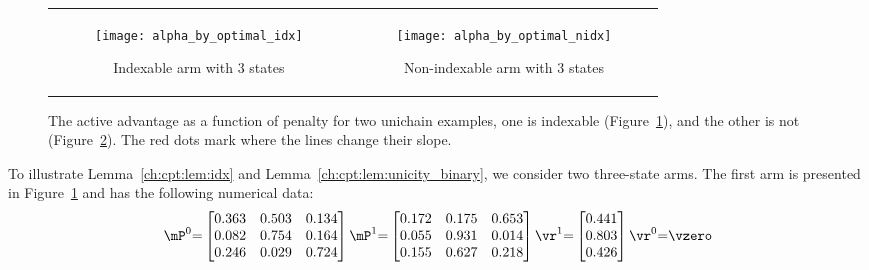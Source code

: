 \begin{figure}[ht]
    \begin{tabular}{cc}
        \begin{subfigure}[t]{0.48\linewidth}
            \texttt{[image: alpha\_by\_optimal\_idx]}
            \caption{Indexable arm with $3$ states}
            \label{fig:illustrate_vf}
        \end{subfigure}
        &\begin{subfigure}[t]{0.48\linewidth}
            \texttt{[image: alpha\_by\_optimal\_nidx]}
            \caption{Non-indexable arm with $3$ states}
            \label{fig:illustrate_non_indexable}
        \end{subfigure}            
    \end{tabular}
    \caption{
        The active advantage as a function of penalty for two unichain examples, one is indexable (Figure~\ref{fig:illustrate_vf}), and the other is not (Figure~\ref{fig:illustrate_non_indexable}).
        The red dots mark where the lines change their slope.
    }
    \label{fig:illustrate_indexability}
\end{figure}

To illustrate Lemma~\ref{ch:cpt:lem:idx} and Lemma~\ref{ch:cpt:lem:unicity_binary}, we consider two three-state arms.
The first arm is presented in Figure~\ref{fig:illustrate_vf} and has the following numerical data:
\begin{equation*}
    \mP^0{=}\begin{bmatrix}
        0.363 & 0.503 & 0.134 \\
        0.082 & 0.754 & 0.164 \\
        0.246 & 0.029 & 0.724
    \end{bmatrix}
    \mP^1{=}\begin{bmatrix}
        0.172 & 0.175 & 0.653 \\
        0.055 & 0.931 & 0.014 \\
        0.155 & 0.627 & 0.218
    \end{bmatrix}
    \vr^1{=}\begin{bmatrix}
        0.441 \\
        0.803 \\
        0.426
    \end{bmatrix}
    \vr^0{=}\vzero
\end{equation*}


